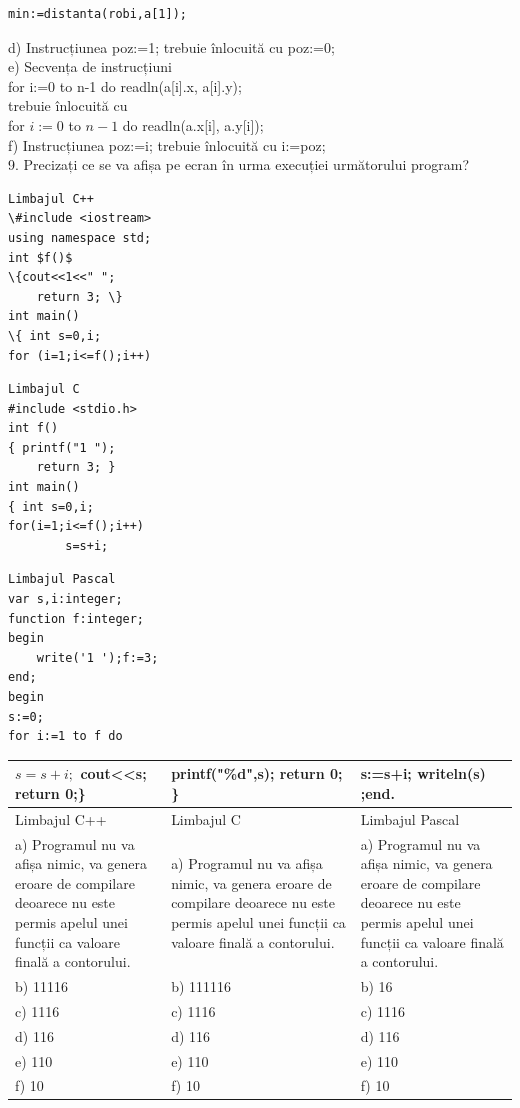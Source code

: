 \documentclass[10pt]{article}
\begin{document}
\begin{verbatim}
min:=distanta(robi,a[1]);
\end{verbatim}

d) Instrucțiunea poz:=1; trebuie înlocuită cu poz:=0;\\
e) Secvența de instrucțiuni\\[0pt]
for i:=0 to n-1 do readln(a[i].x, a[i].y);\\
trebuie înlocuită cu\\
for $i:=0$ to $n-1$ do readln(a.x[i], a.y[i]);\\
f) Instrucțiunea poz:=i; trebuie înlocuită cu i:=poz;\\
9. Precizați ce se va afișa pe ecran în urma execuției următorului program?

\begin{verbatim}
Limbajul C++
\#include <iostream>
using namespace std;
int $f()$
\{cout<<1<<" ";
    return 3; \}
int main()
\{ int s=0,i;
for (i=1;i<=f();i++)
\end{verbatim}

\begin{verbatim}
Limbajul C
#include <stdio.h>
int f()
{ printf("1 ");
    return 3; }
int main()
{ int s=0,i;
for(i=1;i<=f();i++)
        s=s+i;
\end{verbatim}

\begin{verbatim}
Limbajul Pascal
var s,i:integer;
function f:integer;
begin
    write('1 ');f:=3;
end;
begin
s:=0;
for i:=1 to f do
\end{verbatim}

\begin{center}
\begin{tabular}{|l|l|l|}
\hline
$s=s+i ;$ cout<<s; return 0;\} & printf("\%d",s); return 0; \} & s:=s+i; writeln(s) ;end. \\
\hline
Limbajul C++ & Limbajul C & Limbajul Pascal \\
\hline
a) Programul nu va afișa nimic, va genera eroare de compilare deoarece nu este permis apelul unei funcții ca valoare finală a contorului. & a) Programul nu va afișa nimic, va genera eroare de compilare deoarece nu este permis apelul unei funcții ca valoare finală a contorului. & a) Programul nu va afișa nimic, va genera eroare de compilare deoarece nu este permis apelul unei funcții ca valoare finală a contorului. \\
\hline
b) 11116 & b) 111116 & b) 16 \\
\hline
c) 1116 & c) 1116 & c) 1116 \\
\hline
d) 116 & d) 116 & d) 116 \\
\hline
e) 110 & e) 110 & e) 110 \\
\hline
f) 10 & f) 10 & f) 10 \\
\hline
\end{tabular}
\end{center}
\end{document}
